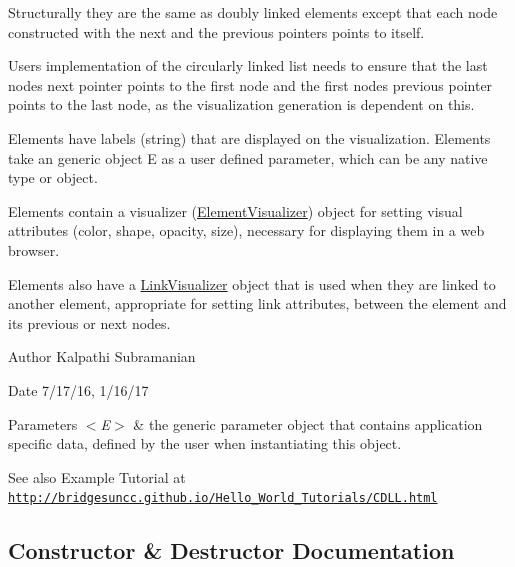Structurally they are the same as doubly linked elements except that each node constructed with the next and the previous pointers points to itself.

User\textquotesingle{}s implementation of the circularly linked list needs to ensure that the last node\textquotesingle{}s next pointer points to the first node and the first node\textquotesingle{}s previous pointer points to the last node, as the visualization generation is dependent on this.

Elements have labels (string) that are displayed on the visualization. Elements take an generic object E as a user defined parameter, which can be any native type or object.

Elements contain a visualizer (\hyperlink{classbridges_1_1base_1_1_element_visualizer}{Element\+Visualizer}) object for setting visual attributes (color, shape, opacity, size), necessary for displaying them in a web browser.

Elements also have a \hyperlink{classbridges_1_1base_1_1_link_visualizer}{Link\+Visualizer} object that is used when they are linked to another element, appropriate for setting link attributes, between the element and its previous or next nodes.

\begin{DoxyAuthor}{Author}
Kalpathi Subramanian
\end{DoxyAuthor}
\begin{DoxyDate}{Date}
7/17/16, 1/16/17
\end{DoxyDate}

\begin{DoxyParams}{Parameters}
{\em $<$\+E$>$} & the generic parameter object that contains application specific data, defined by the user when instantiating this object.\\
\hline
\end{DoxyParams}
\begin{DoxySeeAlso}{See also}
Example Tutorial at ~\newline
 \href{http://bridgesuncc.github.io/Hello_World_Tutorials/CDLL.html}{\tt http\+://bridgesuncc.\+github.\+io/\+Hello\+\_\+\+World\+\_\+\+Tutorials/\+C\+D\+L\+L.\+html} 
\end{DoxySeeAlso}


\subsection{Constructor \& Destructor Documentation}
\hypertarget{classbridges_1_1base_1_1_circ_d_lelement_ad14ccb772d52c36802c118f2b3f15d59}{}
